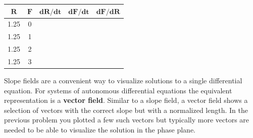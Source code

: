 \begin{enumerate}[resume]
\begin{enumerate}
\begin{center}
\renewcommand{\arraystretch}{2}
\begin{tabular}{|c|c|c|c|c|}
\hline
$\mathbf{R}$&	$\mathbf{F}$&	$\mathbf{dR/dt}$&	$\mathbf{dF/dt}$&	$\mathbf{dF/dR}$\\\hline
1.25	&0&&&\\\hline			
1.25	&1	&&&\\\hline		
1.25	&2	&&&\\\hline		
1.25	&3	&&&\\\hline	
\end{tabular}

\end{center}
\end{enumerate}
\end{enumerate}
\clearpage


Slope fields are a convenient way to visualize solutions to a single differential equation. For systems of autonomous differential equations the equivalent representation is a \textbf{vector field}. Similar to a slope field, a vector field shows a selection of vectors with the correct slope but with a normalized length. In the previous problem you plotted a few such vectors but typically more vectors are needed to be able to visualize the solution in the phase plane.


